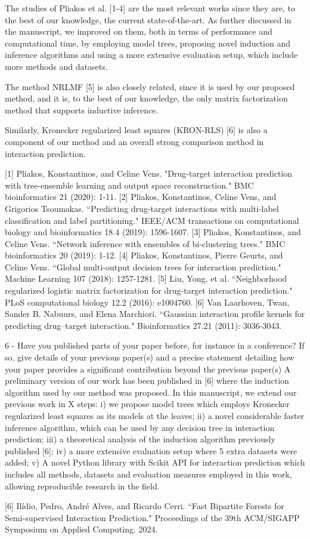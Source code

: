 \documentclass[sn-mathphys-num]{sn-jnl}
\begin{document}
The studies of Pliakos et al. [1-4] are the most relevant works since they are, to the best of our knowledge, the current state-of-the-art. As further discussed in the manuscript, we improved on them, both in terms of performance and computational time, by employing model trees, proposing novel induction and inference algorithms and using a more extensive evaluation setup, which include more methods and datasets. 

The method NRLMF [5] is also closely related, since it is used by our proposed method, and it is, to the best of our knowledge, the only matrix factorization method that supports inductive inference. 

Similarly, Kronecker regularized least squares (KRON-RLS) [6] is also a component of our method and an overall strong comparison method in interaction prediction.

[1] Pliakos, Konstantinos, and Celine Vens. "Drug-target interaction prediction with tree-ensemble learning and output space reconstruction." BMC bioinformatics 21 (2020): 1-11.
[2] Pliakos, Konstantinos, Celine Vens, and Grigorios Tsoumakas. ``Predicting drug-target interactions with multi-label classification and label partitioning." IEEE/ACM transactions on computational biology and bioinformatics 18.4 (2019): 1596-1607.
[3] Pliakos, Konstantinos, and Celine Vens. ``Network inference with ensembles of bi-clustering trees." BMC bioinformatics 20 (2019): 1-12.
[4] Pliakos, Konstantinos, Pierre Geurts, and Celine Vens. ``Global multi-output decision trees for interaction prediction." Machine Learning 107 (2018): 1257-1281.
[5] Liu, Yong, et al. ``Neighborhood regularized logistic matrix factorization for drug-target interaction prediction." PLoS computational biology 12.2 (2016): e1004760.
[6] Van Laarhoven, Twan, Sander B. Nabuurs, and Elena Marchiori. ``Gaussian interaction profile kernels for predicting drug–target interaction." Bioinformatics 27.21 (2011): 3036-3043.

6 - Have you published parts of your paper before, for instance in a conference? If so, give details of your previous paper(s) and a precise statement detailing how your paper provides a significant contribution beyond the previous paper(s)
A preliminary version of our work has been published in [6] where the induction algorithm used by our method was proposed. In this manuscript, we extend our previous work in X steps: i) we propose model trees which employs Kronecker regularized least squares as its models at the leaves; ii) a novel considerable faster inference algorithm, which can be used by any decision tree in interaction prediction; iii) a theoretical analysis of the induction algorithm previously published [6]; iv) a more extensive evaluation setup where 5 extra datasets were added; v) A novel Python library with Scikit API for interaction prediction which includes all methods, datasets and evaluation measures employed in this work, allowing reproducible research in the field.

[6] Ilídio, Pedro, André Alves, and Ricardo Cerri. ``Fast Bipartite Forests for Semi-supervised Interaction Prediction." Proceedings of the 39th ACM/SIGAPP Symposium on Applied Computing. 2024.
\end{document}
